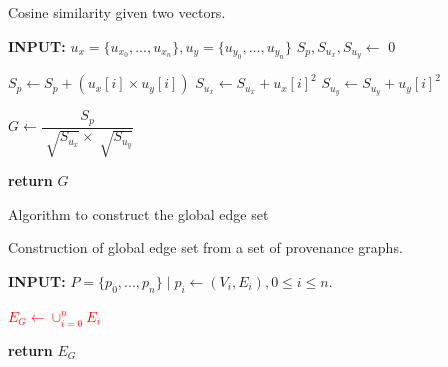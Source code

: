 







\begin{algorithm}
\caption{Cosine similarity given two vectors.}
 \label{alg:graph_similarity}
 
\begin{algorithmic}[1]

\State \textbf{INPUT: } $u_x=\{u_{x_0},...,u_{x_n}\},u_y=\{u_{y_0},...,u_{y_n}\}$
\State $S_p, S_{u_x}, S_{u_y} \gets$ 0

\State $S_p \gets S_p + (u_x[i] \times u_y[i])$
\State $ S_{u_x} \gets  S_{u_x} + u_x[i]^2$
\State $S_{u_y} \gets S_{u_y} + u_y[i]^2$

\EndFor

\State $G \gets \dfrac{S_p}{\sqrt[]{S_{u_x}} \times \sqrt[]{S_{u_y}} }$


\State \textbf{return} $G$

\EndProcedure

\end{algorithmic}

\end{algorithm}

\begin{algorithm}
\caption{Algorithm to construct the global edge set}

\begin{algorithmic}[1]  
\caption{Construction of global edge set from a set of provenance graphs.}
\label{graph_to_globaledgelist}

\State \textbf{INPUT: } $P=\{p_0,...,p_n\} \mid p_i\gets (V_i, E_i), 0 \leq i \leq n.$

\State \textcolor{red}{$E_G \gets \cup_{i=0}^{n} E_i$}

\State \textbf{return} $E_G$

\EndProcedure

\end{algorithmic}
\end{algorithm}


